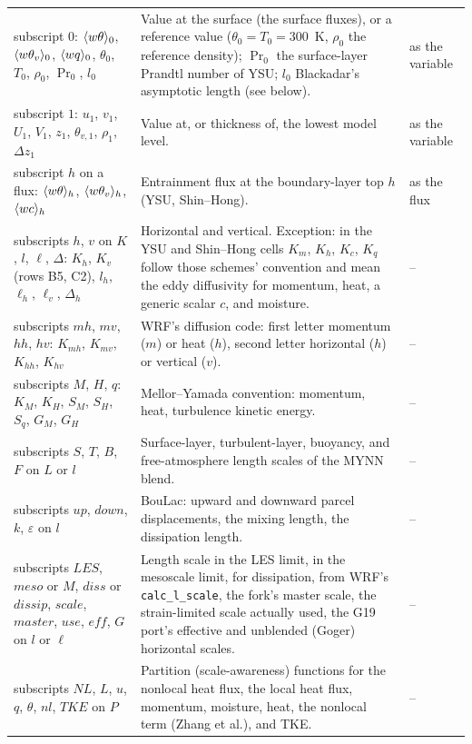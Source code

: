 \begin{xltabular}{\linewidth}{@{}>{\raggedright\arraybackslash}p{3.6cm} >{\raggedright\arraybackslash}X >{\raggedright\arraybackslash}p{2.3cm}@{}}
subscript $0$: $\langle w\theta \rangle_0$, $\langle w\theta_v \rangle_0$, $\langle wq \rangle_0$, $\theta_0$, $T_0$, $\rho_0$, $\Pr_0$, $l_0$ & Value at the surface (the surface fluxes), or a reference value ($\theta_0 = T_0 = 300$~K, $\rho_0$ the reference density); $\Pr_0$ the surface-layer Prandtl number of YSU; $l_0$ Blackadar's asymptotic length (see below). & as the variable \\
subscript $1$: $u_1$, $v_1$, $U_1$, $V_1$, $z_1$, $\theta_{v,1}$, $\rho_1$, $\Delta z_1$ & Value at, or thickness of, the lowest model level. & as the variable \\
subscript $h$ on a flux: $\langle w\theta \rangle_h$, $\langle w\theta_v \rangle_h$, $\langle wc \rangle_h$ & Entrainment flux at the boundary-layer top $h$ (YSU, Shin--Hong). & as the flux \\
subscripts $h$, $v$ on $K$, $l$, $\ell$, $\Delta$: $K_h$, $K_v$ (rows B5, C2), $l_h$, $\ell_h$, $\ell_v$, $\Delta_h$ & Horizontal and vertical. Exception: in the YSU and Shin--Hong cells $K_m$, $K_h$, $K_c$, $K_q$ follow those schemes' convention and mean the eddy diffusivity for momentum, heat, a generic scalar $c$, and moisture. & -- \\
subscripts $mh$, $mv$, $hh$, $hv$: $K_{mh}$, $K_{mv}$, $K_{hh}$, $K_{hv}$ & WRF's diffusion code: first letter momentum ($m$) or heat ($h$), second letter horizontal ($h$) or vertical ($v$). & -- \\
subscripts $M$, $H$, $q$: $K_M$, $K_H$, $S_M$, $S_H$, $S_q$, $G_M$, $G_H$ & Mellor--Yamada convention: momentum, heat, turbulence kinetic energy. & -- \\
subscripts $S$, $T$, $B$, $F$ on $L$ or $l$ & Surface-layer, turbulent-layer, buoyancy, and free-atmosphere length scales of the MYNN blend. & -- \\
subscripts $up$, $down$, $k$, $\varepsilon$ on $l$ & BouLac: upward and downward parcel displacements, the mixing length, the dissipation length. & -- \\
subscripts $LES$, $meso$ or $M$, $diss$ or $dissip$, $scale$, $master$, $use$, $eff$, $G$ on $l$ or $\ell$ & Length scale in the LES limit, in the mesoscale limit, for dissipation, from WRF's \texttt{calc\_l\_scale}, the fork's master scale, the strain-limited scale actually used, the G19 port's effective and unblended (Goger) horizontal scales. & -- \\
subscripts $NL$, $L$, $u$, $q$, $\theta$, $nl$, $TKE$ on $P$ & Partition (scale-awareness) functions for the nonlocal heat flux, the local heat flux, momentum, moisture, heat, the nonlocal term (Zhang et al.), and TKE. & -- \\

\end{xltabular}
